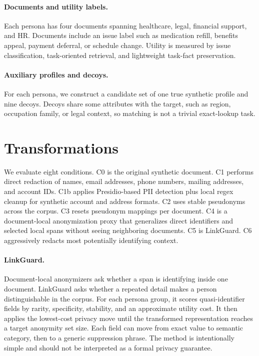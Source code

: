 \documentclass[10pt,twocolumn]{article}
\newcommand{\method}{LinkGuard}
\begin{document}
\paragraph{Documents and utility labels.}
Each persona has four documents spanning healthcare, legal, financial support, and HR.
Documents include an issue label such as medication refill, benefits appeal, payment deferral, or schedule change.
Utility is measured by issue classification, task-oriented retrieval, and lightweight task-fact preservation.

\paragraph{Auxiliary profiles and decoys.}
For each persona, we construct a candidate set of one true synthetic profile and nine decoys.
Decoys share some attributes with the target, such as region, occupation family, or legal context, so matching is not a trivial exact-lookup task.

\section{Transformations}
We evaluate eight conditions.
C0 is the original synthetic document.
C1 performs direct redaction of names, email addresses, phone numbers, mailing addresses, and account IDs.
C1b applies Presidio-based PII detection plus local regex cleanup for synthetic account and address formats.
C2 uses stable pseudonyms across the corpus.
C3 resets pseudonym mappings per document.
C4 is a document-local anonymization proxy that generalizes direct identifiers and selected local spans without seeing neighboring documents.
C5 is \method.
C6 aggressively redacts most potentially identifying context.

\paragraph{\method.}
Document-local anonymizers ask whether a span is identifying inside one document.
\method{} asks whether a repeated detail makes a person distinguishable in the corpus.
For each persona group, it scores quasi-identifier fields by rarity, specificity, stability, and an approximate utility cost.
It then applies the lowest-cost privacy move until the transformed representation reaches a target anonymity set size.
Each field can move from exact value to semantic category, then to a generic suppression phrase.
The method is intentionally simple and should not be interpreted as a formal privacy guarantee.
\end{document}
